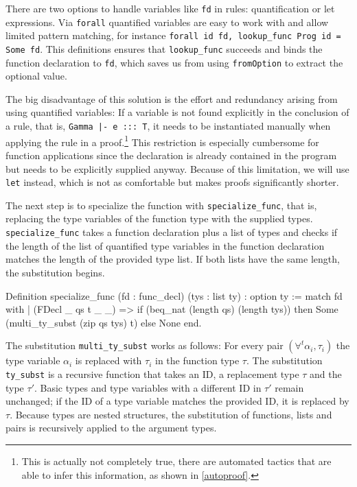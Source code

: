 \documentclass[paper = a4, fleqn, twoside]{scrreprt}
\newcommand{\coqinline}[1]{\texttt{#1}}
\begin{document}
There are two options to handle variables like \texttt{fd} in rules: quantification or let expressions. Via \coqinline{forall} quantified variables are easy to work with and allow limited pattern matching, for instance \coqinline{forall id fd, lookup_func Prog id = Some fd}. This definitions ensures that \coqinline{lookup_func} succeeds and binds the function declaration to \coqinline{fd}, which saves us from using \coqinline{fromOption} to extract the optional value.
\par
The big disadvantage of this solution is the effort and redundancy arising from using quantified variables: If a variable is not found explicitly in the conclusion of a rule, that is, \coqinline{Gamma |- e ::: T}, it needs to be instantiated manually when applying the rule in a proof.\footnote{This is actually not completely true, there are automated tactics that are able to infer this information, as shown in \autoref{autoproof}.} This restriction is especially cumbersome for function applications since the declaration is already contained in the program but needs to be explicitly supplied anyway. Because of this limitation, we will use \coqinline{let} instead, which is not as comfortable but makes proofs significantly shorter.\\
\par \noindent
The next step is to specialize the function with \coqinline{specialize_func}, that is, replacing the type variables of the function type with the supplied types. \coqinline{specialize_func} takes a function declaration plus a list of types and checks if the length of the list of quantified type variables in the function declaration matches the length of the provided type list. If both lists have the same length, the substitution begins.
\begin{coqcode}
Definition specialize_func (fd : func_decl) (tys : list ty) : option ty := 
  match fd with
  | (FDecl _ qs t _ _) => if (beq_nat (length qs) (length tys))
                          then Some (multi_ty_subst (zip qs tys) t)
                          else None
  end.
\end{coqcode}
The substitution \texttt{multi\_ty\_subst} works as follows: For every pair $(\forall^{t}\alpha_{i}, \tau_{i})$ the type variable $\alpha_{i}$ is replaced with $\tau_{i}$ in the function type $\tau$. The substitution \texttt{ty\_subst} is a recursive function that takes an ID, a replacement type $\tau$ and the type $\tau'$. Basic types and type variables with a different ID in $\tau'$ remain unchanged; if the ID of a type variable matches the provided ID, it is replaced by $\tau$. Because types are nested structures, the substitution of functions, lists and pairs is recursively applied to the argument types.
\end{document}
